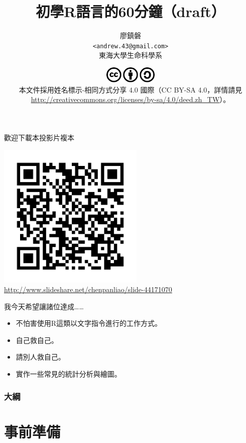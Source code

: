 \documentclass[12pt]{beamer}
\title[初學者學習R語言]{初學R語言的60分鐘（draft）}
\author[廖鎮磐]{廖鎮磐 \\ \texttt{<andrew.43@gmail.com>}\\ 東海大學生命科學系}
\institute{\normalsize 2015年3月14日於蓮華池}
\date{\footnotesize \includegraphics[width=1in]{cc.pdf}\\[5pt]
本文件採用姓名標示-相同方式分享 4.0 國際（CC BY-SA 4.0，詳情請見 \url{http://creativecommons.org/licenses/by-sa/4.0/deed.zh_TW}）。}
\begin{document}
\begin{frame}
\titlepage
\end{frame}

\begin{frame}{歡迎下載本投影片複本}
\begin{center}
\includegraphics[width=2.75in]{url.pdf}\\
\scriptsize\url{http://www.slideshare.net/chenpanliao/slide-44171070}
\end{center}
\end{frame}

\begin{frame}{我今天希望讓諸位達成\ldots\ldots}
\begin{itemize}
\item 不怕害使用R這類以文字指令進行的工作方式。
\item 自己救自己。
\item 請別人救自己。
\item 實作一些常見的統計分析與繪圖。
\end{itemize}
\end{frame}


\begin{frame}
\frametitle{大綱}
\tableofcontents
\end{frame}

\section{事前準備}\subsection{}
\end{document}
